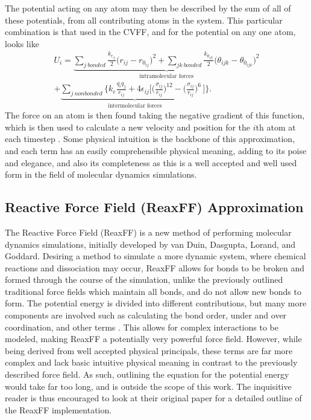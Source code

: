 			The potential acting on any atom may then be described by the sum of all of these potentials, from all contributing atoms in the system. This particular combination is that used in the CVFF, and for the potential on any one atom, looks like
			\begin{multline}
				U_i = \underbrace{\sum_{j\:bonded}\frac{k_{r_{ij}}}{2}\big( r_{ij} - r_{0_{ij}} \big)^2 + \sum_{jk\:bonded}\frac{k_{\theta_{ijk}}}{2}\big( \theta_{ijk} - \theta_{0_{ijk}} \big)^2}_\text{intramolecular forces}  \\ + \underbrace{\sum_{j\:nonbonded}\bigg\{k_e \frac{q_iq_j}{r_{ij}} + 4\epsilon_{ij}\bigg[ \bigg(\frac{\sigma_{ij}}{r_{ij}}\bigg)^{12} - \bigg(\frac{\sigma_{ij}}{r_{ij}}\bigg)^6\,\bigg]\bigg\}}_\text{intermolecular forces}.
				\label{eq:potential}
			\end{multline}
			The force on an atom is then found taking the negative gradient of this function, which is then used to calculate a new velocity and position for the $i$th atom at each timestep \cite{heinz2005force}. Some physical intuition is the backbone of this approximation, and each term has an easily comprehensible physical meaning, adding to its poise and elegance, and also its completeness as this is a well accepted and well used form in the field of molecular dynamics simulations.
			
		\subsection{Reactive Force Field (ReaxFF) Approximation}
			The Reactive Force Field (ReaxFF) is a new method of performing molecular dynamics simulations, initially developed by van Duin, Dasgupta, Lorand, and Goddard. Desiring a method to simulate a more dynamic system, where chemical reactions and dissociation may occur, ReaxFF allows for bonds to be broken and formed through the course of the simulation, unlike the previously outlined traditional force fields which maintain all bonds, and do not allow new bonds to form. The potential energy is divided into different contributions, but many more components are involved such as calculating the bond order, under and over coordination, and other terms \cite{vanDuin2001reaxff}. This allows for complex interactions to be modeled, making ReaxFF a potentially very powerful force field. However, while being derived from well accepted physical principals, these terms are far more complex and lack basic intuitive physical meaning in contrast to the previously described force field. As such, outlining the equation for the potential energy would take far too long, and is outside the scope of this work. The inquisitive reader is thus encouraged to look at their original paper for a detailed outline of the ReaxFF implementation.
			
